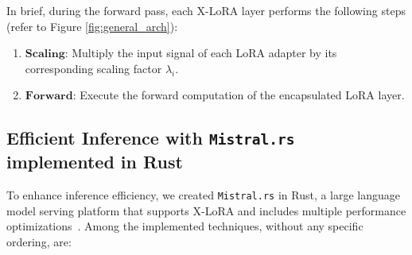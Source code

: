 In brief, during the forward pass, each X-LoRA layer performs the following steps (refer to Figure \ref{fig:general_arch}):

\begin{enumerate}
    \item $\mathbf{Scaling}$: Multiply the input signal of each LoRA adapter by its corresponding scaling factor $\lambda_i$.
    \item $\mathbf{Forward}$: Execute the forward computation of the encapsulated LoRA layer.
\end{enumerate}

\subsection{Efficient Inference with \texttt{Mistral.rs} implemented in Rust} To enhance inference efficiency, we created \texttt{Mistral.rs} in Rust, a large language model serving platform that supports X-LoRA and includes multiple performance optimizations~\cite{matsakis2014rust}. Among the implemented techniques, without any specific ordering, are:

